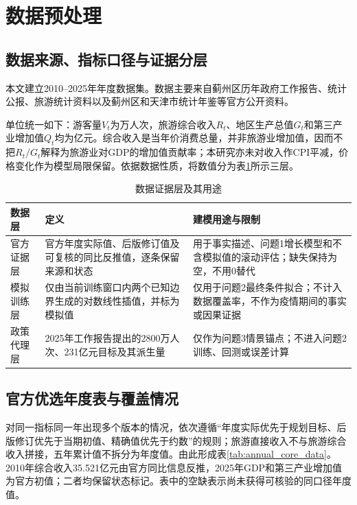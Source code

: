 \documentclass[withoutpreface,bwprint]{cumcmthesis}
\begin{document}
\section{数据预处理}

\subsection{数据来源、指标口径与证据分层}

本文建立2010--2025年年度数据集。数据主要来自蓟州区历年政府工作报告、统计公报、旅游统计资料以及蓟州区和天津市统计年鉴等官方公开资料\cite{jizhou2011bulletin,jizhou2024yearbook,jizhou2025report,jizhou2025bulletin}。

单位统一如下：游客量$V_t$为万人次，旅游综合收入$R_t$、地区生产总值$G_t$和第三产业增加值$Q_t$均为亿元。综合收入是当年价消费总量，并非旅游业增加值，因而不把$R_t/G_t$解释为旅游业对GDP的增加值贡献率；本研究亦未对收入作CPI平减，价格变化作为模型局限保留。依据数据性质，将数值分为表\ref{tab:data_layers_new}所示三层。

\begin{table}[H]
\centering
\caption{数据证据层及其用途}
\label{tab:data_layers_new}
\small
\renewcommand{\arraystretch}{1.12}
\begin{tabularx}{\textwidth}{p{2.4cm}p{4.3cm}X}
\toprule
数据层 & 定义 & 建模用途与限制 \\
\midrule
官方证据层 & 官方年度实际值、后版修订值及可复核的同比反推值，逐条保留来源和状态 & 用于事实描述、问题1增长模型和不含模拟值的滚动评估；缺失保持为空，不用0替代 \\
模拟训练层 & 仅由当前训练窗口内两个已知边界生成的对数线性插值，并标为模拟值 & 仅用于问题2最终条件拟合；不计入数据覆盖率，不作为疫情期间的事实或因果证据 \\
政策代理层 & 2025年工作报告提出的2800万人次、231亿元目标及其派生量 & 仅作为问题3情景锚点；不进入问题2训练、回测或误差计算 \\
\bottomrule
\end{tabularx}
\end{table}

\subsection{官方优选年度表与覆盖情况}

对同一指标同一年出现多个版本的情况，依次遵循“年度实际优先于规划目标、后版修订优先于当期初值、精确值优先于约数”的规则；旅游直接收入不与旅游综合收入拼接，五年累计值不拆分为年度值。由此形成表\ref{tab:annual_core_data}。2010年综合收入35.521亿元由官方同比信息反推，2025年GDP和第三产业增加值为官方初值；二者均保留状态标记。表中的空缺表示尚未获得可核验的同口径年度值。
\end{document}
